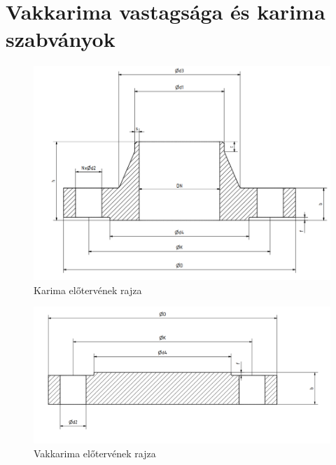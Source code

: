 \section{Vakkarima vastagsága és karima szabványok}

\begin{figure}[hbt!]
	\centering
	\includegraphics[scale=.61]{./images/karima.png}
	\caption{Karima előtervének rajza}
\end{figure}

\newpage
\begin{figure}[hbt!]
	\centering
	\includegraphics[scale=.34]{./images/vakkarima.png}
	\caption{Vakkarima előtervének rajza}
\end{figure}
